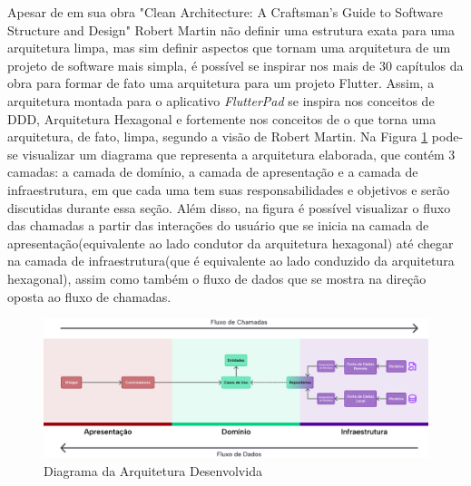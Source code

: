 \documentclass[12pt, %
openright, 
oneside, %
a4paper,    %
brazil]{facom-ufu-abntex2}
\begin{document}
Apesar de em sua obra "Clean Architecture: A Craftsman's Guide to Software Structure and Design" Robert Martin não definir uma estrutura exata para uma arquitetura limpa, mas sim definir aspectos que tornam uma arquitetura de um projeto de software mais simpla, é possível se inspirar nos mais de 30 capítulos da obra para formar de fato uma arquitetura para um projeto Flutter. Assim, a arquitetura montada para o aplicativo \textit{FlutterPad} se inspira nos conceitos de DDD, Arquitetura Hexagonal e fortemente nos conceitos de o que torna uma arquitetura, de fato, limpa, segundo a visão de Robert Martin. Na Figura \ref{fig:arch_diagram} pode-se visualizar um diagrama que representa a arquitetura elaborada, que contém 3 camadas: a camada de domínio, a camada de apresentação e a camada de infraestrutura, em que cada uma tem suas responsabilidades e objetivos e serão discutidas durante essa seção. Além disso, na figura é possível visualizar o fluxo das chamadas a partir das interações do usuário que se inicia na camada de apresentação(equivalente ao lado condutor da arquitetura hexagonal) até chegar na camada de infraestrutura(que é equivalente ao lado conduzido da arquitetura hexagonal), assim como também o fluxo de dados que se mostra na direção oposta ao fluxo de chamadas.

\begin{figure}[ht]
    \centering
    \includegraphics[width=1\textwidth]{figures/arch/arch_diagram.png}
    \caption{Diagrama da Arquitetura Desenvolvida}
    \label{fig:arch_diagram}
\end{figure}
\end{document}
